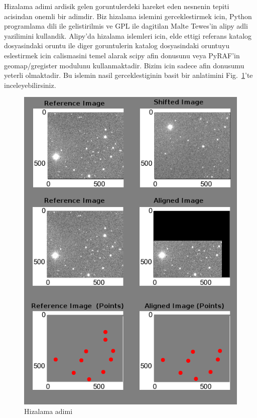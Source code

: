 \documentclass[review]{elsarticle}
\begin{document}
Hizalama adimi ardisik gelen goruntulerdeki hareket eden nesnenin tepiti acisindan onemli bir adimdir. Biz hizalama islemini gerceklestirmek icin, Python programlama dili ile gelistirilmis ve GPL ile dagitilan Malte Tewes’in alipy adli yazilimini kullandik. Alipy’da hizalama islemleri icin, elde ettigi referans katalog dosyasindaki oruntu ile diger goruntulerin katalog dosyasindaki oruntuyu eslestirmek icin \citep{lang2010} calismasini temel alarak scipy afin donusunu veya PyRAF’in geomap/gregister modulunu kullanmaktadir. Bizim icin sadece afin donusumu yeterli olmaktadir. Bu islemin nasil gerceklestiginin basit bir anlatimini Fig.~\ref{fig:hizalama}’te inceleyebilirsiniz. 
\begin{figure}[!t]
  \centering
  \includegraphics[scale=0.50]{align}
  \caption{Hizalama adimi}
  \label{fig:hizalama}
\end{figure}
\end{document}
